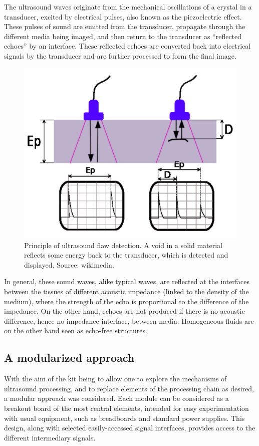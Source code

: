 \documentclass[letterpaper, 10 pt, conference]{ieeeconf} %
\begin{document}
The ultrasound waves originate from the mechanical oscillations of a crystal in a transducer, excited by electrical pulses, also known as the piezoelectric effect. These pulses of sound are emitted from the transducer, propagate through the different media being imaged, and then return to the transducer as ``reflected echoes'' by an interface. These reflected echoes are converted back into electrical signals by the transducer and are further processed to form the final image.

\begin{figure}%
\centering
\includegraphics[width=.8\linewidth]{principles.pdf}
\caption{Principle of ultrasound flaw detection. A void in a solid material reflects some energy back to the transducer, which is detected and displayed. Source: wikimedia.}
\end{figure}


In general, these sound waves, alike typical waves, are reflected at the interfaces between the tissues of different acoustic impedance (linked to the density of the medium), where the strength of the echo is proportional to the difference of the impedance. On the other hand, echoes are not produced if there is no acoustic difference, hence no impedance interface, between media. Homogeneous fluids are on the other hand seen as echo-free structures.


\subsection{A modularized approach}

With the aim of the kit being to allow one to explore the mechanisms of ultrasound processing, and to replace elements of the processing chain as desired, a modular approach was considered. Each module can be considered as a breakout board of the most central elements, intended for easy experimentation with usual equipment, such as breadboards and standard power supplies. This design, along with selected easily-accessed signal interfaces, provides access to the different intermediary signals.
\end{document}
